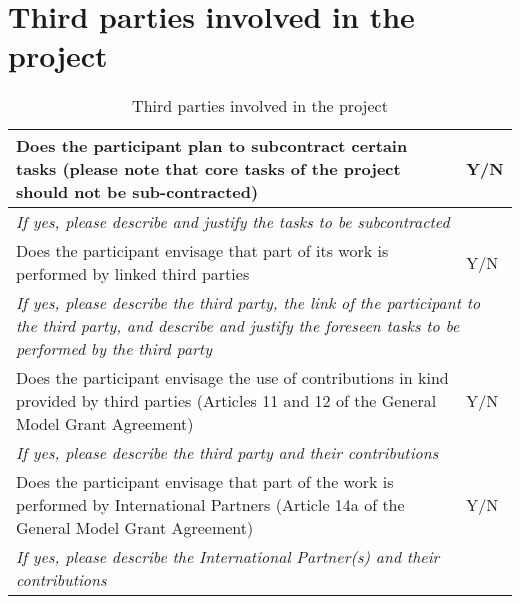 \section{Third parties involved in the project}

\begin{table}[H]
	\centering
	\begin{tabular}{|p{10cm}|p{4cm}|}
		\hline
		Does the participant plan to subcontract certain tasks (please note that core tasks of the project should not be sub-contracted)                                          & Y/N                        \\ \hline
		\multicolumn{2}{|p{14cm}|}{\textit{If yes, please describe and justify the tasks to be subcontracted}}                                                                                                       \\ \hline
		Does the participant envisage that part of its work is performed by linked third parties                                                                                  & Y/N                        \\ \hline
		\multicolumn{2}{|p{14cm}|}{\textit{If yes, please describe the third party, the link of the participant to the third party, and describe and justify the foreseen tasks to be performed by the third party}} \\ \hline
		Does the participant envisage the use of contributions in kind provided by third parties (Articles 11 and 12 of the General Model Grant Agreement)                        & Y/N                        \\ \hline
		\multicolumn{2}{|p{14cm}|}{\textit{If yes, please describe the third party and their contributions}}                                                                                                         \\ \hline
		Does the participant envisage that part of the work is performed by International Partners (Article 14a of the General Model Grant Agreement)                             & Y/N                        \\ \hline
		\multicolumn{2}{|p{14cm}|}{\textit{If yes, please describe the International Partner(s) and their contributions}}                                                                                            \\ \hline
	\end{tabular}
	\caption{Third parties involved in the project}
\end{table}

